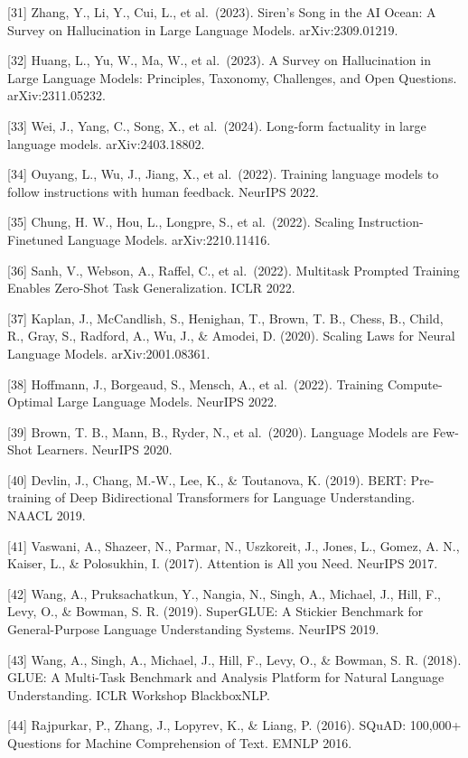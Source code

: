 {[}31{]} Zhang, Y., Li, Y., Cui, L., et al.~(2023). Siren's Song in the AI Ocean: A Survey on Hallucination in Large Language Models. arXiv:2309.01219.

{[}32{]} Huang, L., Yu, W., Ma, W., et al.~(2023). A Survey on Hallucination in Large Language Models: Principles, Taxonomy, Challenges, and Open Questions. arXiv:2311.05232.

{[}33{]} Wei, J., Yang, C., Song, X., et al.~(2024). Long-form factuality in large language models. arXiv:2403.18802.

{[}34{]} Ouyang, L., Wu, J., Jiang, X., et al.~(2022). Training language models to follow instructions with human feedback. NeurIPS 2022.

{[}35{]} Chung, H. W., Hou, L., Longpre, S., et al.~(2022). Scaling Instruction-Finetuned Language Models. arXiv:2210.11416.

{[}36{]} Sanh, V., Webson, A., Raffel, C., et al.~(2022). Multitask Prompted Training Enables Zero-Shot Task Generalization. ICLR 2022.

{[}37{]} Kaplan, J., McCandlish, S., Henighan, T., Brown, T. B., Chess, B., Child, R., Gray, S., Radford, A., Wu, J., \& Amodei, D. (2020). Scaling Laws for Neural Language Models. arXiv:2001.08361.

{[}38{]} Hoffmann, J., Borgeaud, S., Mensch, A., et al.~(2022). Training Compute-Optimal Large Language Models. NeurIPS 2022.

{[}39{]} Brown, T. B., Mann, B., Ryder, N., et al.~(2020). Language Models are Few-Shot Learners. NeurIPS 2020.

{[}40{]} Devlin, J., Chang, M.-W., Lee, K., \& Toutanova, K. (2019). BERT: Pre-training of Deep Bidirectional Transformers for Language Understanding. NAACL 2019.

{[}41{]} Vaswani, A., Shazeer, N., Parmar, N., Uszkoreit, J., Jones, L., Gomez, A. N., Kaiser, L., \& Polosukhin, I. (2017). Attention is All you Need. NeurIPS 2017.

{[}42{]} Wang, A., Pruksachatkun, Y., Nangia, N., Singh, A., Michael, J., Hill, F., Levy, O., \& Bowman, S. R. (2019). SuperGLUE: A Stickier Benchmark for General-Purpose Language Understanding Systems. NeurIPS 2019.

{[}43{]} Wang, A., Singh, A., Michael, J., Hill, F., Levy, O., \& Bowman, S. R. (2018). GLUE: A Multi-Task Benchmark and Analysis Platform for Natural Language Understanding. ICLR Workshop BlackboxNLP.

{[}44{]} Rajpurkar, P., Zhang, J., Lopyrev, K., \& Liang, P. (2016). SQuAD: 100,000+ Questions for Machine Comprehension of Text. EMNLP 2016.

